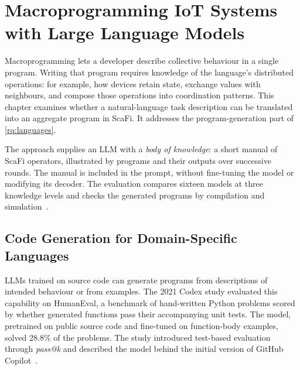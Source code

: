 \chapter{Macroprogramming IoT Systems with Large Language Models}
\label{chap:language-based-macroprogramming}


Macroprogramming lets a developer describe collective behaviour in a single program.
Writing that program requires knowledge of the language's distributed operations:
for example, how devices retain state, exchange values with neighbours, and compose those operations into coordination patterns.
This chapter examines whether a natural-language task description can be translated into an aggregate program in ScaFi.
It addresses the program-generation part of \cref{rq:languages}.

The approach supplies an \ac{LLM} with a \emph{body of knowledge}:
a short manual of ScaFi operators, illustrated by programs and their outputs over successive rounds.
The manual is included in the prompt, without fine-tuning the model or modifying its decoder.
The evaluation compares sixteen models at three knowledge levels and checks the generated programs by compilation and simulation~\cite{DBLP:journals/tiot/AguzziFV25}.

\section{Code Generation for Domain-Specific Languages}
\label{sec:llms-for-code-generation}

\Acp{LLM} trained on source code can generate programs from descriptions of intended behaviour or from examples.
The 2021 Codex study evaluated this capability on HumanEval,
a benchmark of hand-written Python problems scored by whether generated functions pass their accompanying unit tests.
The model, pretrained on public source code and fine-tuned on function-body examples,
solved 28.8\% of the problems.
The study introduced test-based evaluation through \emph{pass@k} and described the model behind the initial version of GitHub Copilot~\cite{DBLP:journals/corr/abs-2107-03374}.

